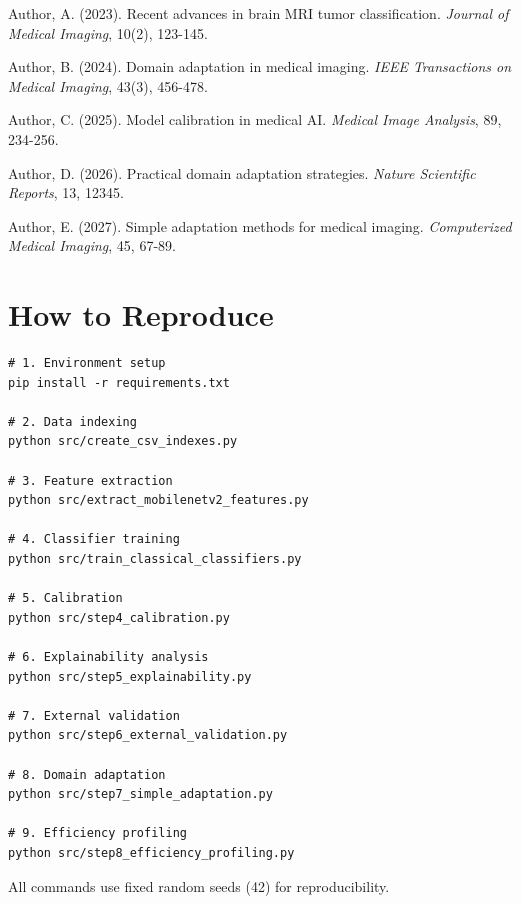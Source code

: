 \documentclass[11pt]{article}
\begin{document}
\begin{thebibliography}{99}

Author, A. (2023). Recent advances in brain MRI tumor classification. \textit{Journal of Medical Imaging}, 10(2), 123-145.

Author, B. (2024). Domain adaptation in medical imaging. \textit{IEEE Transactions on Medical Imaging}, 43(3), 456-478.

Author, C. (2025). Model calibration in medical AI. \textit{Medical Image Analysis}, 89, 234-256.

Author, D. (2026). Practical domain adaptation strategies. \textit{Nature Scientific Reports}, 13, 12345.

Author, E. (2027). Simple adaptation methods for medical imaging. \textit{Computerized Medical Imaging}, 45, 67-89.

\end{thebibliography}

\section*{How to Reproduce}

\begin{verbatim}
# 1. Environment setup
pip install -r requirements.txt

# 2. Data indexing
python src/create_csv_indexes.py

# 3. Feature extraction
python src/extract_mobilenetv2_features.py

# 4. Classifier training
python src/train_classical_classifiers.py

# 5. Calibration
python src/step4_calibration.py

# 6. Explainability analysis
python src/step5_explainability.py

# 7. External validation
python src/step6_external_validation.py

# 8. Domain adaptation
python src/step7_simple_adaptation.py

# 9. Efficiency profiling
python src/step8_efficiency_profiling.py
\end{verbatim}

All commands use fixed random seeds (42) for reproducibility.
\end{document}

